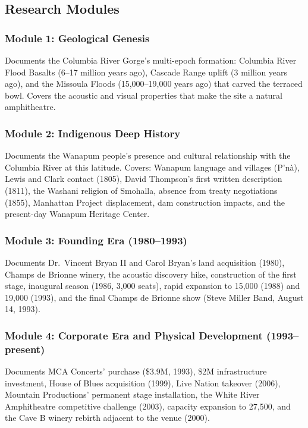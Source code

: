 \documentclass[11pt,letterpaper]{article}
\begin{document}
\subsection{Research Modules}

\subsubsection{Module 1: Geological Genesis}
Documents the Columbia River Gorge's multi-epoch formation: Columbia River Flood Basalts (6--17 million years ago), Cascade Range uplift (3 million years ago), and the Missoula Floods (15,000--19,000 years ago) that carved the terraced bowl. Covers the acoustic and visual properties that make the site a natural amphitheatre.

\subsubsection{Module 2: Indigenous Deep History}
Documents the Wanapum people's presence and cultural relationship with the Columbia River at this latitude. Covers: Wanapum language and villages (P'n\`a), Lewis and Clark contact (1805), David Thompson's first written description (1811), the Washani religion of Smohalla, absence from treaty negotiations (1855), Manhattan Project displacement, dam construction impacts, and the present-day Wanapum Heritage Center.

\subsubsection{Module 3: Founding Era (1980--1993)}
Documents Dr.\ Vincent Bryan II and Carol Bryan's land acquisition (1980), Champs de Brionne winery, the acoustic discovery hike, construction of the first stage, inaugural season (1986, 3,000 seats), rapid expansion to 15,000 (1988) and 19,000 (1993), and the final Champs de Brionne show (Steve Miller Band, August 14, 1993).

\subsubsection{Module 4: Corporate Era and Physical Development (1993--present)}
Documents MCA Concerts' purchase (\$3.9M, 1993), \$2M infrastructure investment, House of Blues acquisition (1999), Live Nation takeover (2006), Mountain Productions' permanent stage installation, the White River Amphitheatre competitive challenge (2003), capacity expansion to 27,500, and the Cave B winery rebirth adjacent to the venue (2000).
\end{document}
